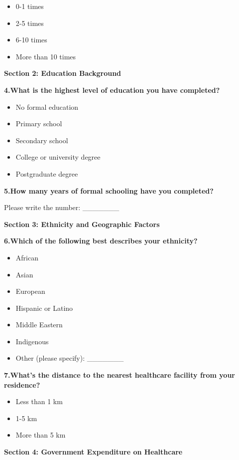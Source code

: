 \documentclass[
  letterpaper,
  DIV=11,
  numbers=noendperiod]{scrartcl}
\providecommand{\tightlist}{%
  \setlength{\itemsep}{0pt}\setlength{\parskip}{0pt}}\usepackage{longtable,booktabs,array}
\begin{document}
\begin{itemize}
\tightlist
\item
  0-1 times
\item
  2-5 times
\item
  6-10 times
\item
  More than 10 times
\end{itemize}

\textbf{Section 2: Education Background}

\textbf{4.What is the highest level of education you have completed?}

\begin{itemize}
\tightlist
\item
  No formal education
\item
  Primary school
\item
  Secondary school
\item
  College or university degree
\item
  Postgraduate degree
\end{itemize}

\textbf{5.How many years of formal schooling have you completed?}

Please write the number: \_\_\_\_\_\_\_

\textbf{Section 3: Ethnicity and Geographic Factors}

\textbf{6.Which of the following best describes your ethnicity?}

\begin{itemize}
\tightlist
\item
  African
\item
  Asian
\item
  European
\item
  Hispanic or Latino
\item
  Middle Eastern
\item
  Indigenous
\item
  Other (please specify): \_\_\_\_\_\_\_
\end{itemize}

\textbf{7.What's the distance to the nearest healthcare facility from
your residence?}

\begin{itemize}
\tightlist
\item
  Less than 1 km
\item
  1-5 km
\item
  More than 5 km
\end{itemize}

\textbf{Section 4: Government Expenditure on Healthcare}
\end{document}
